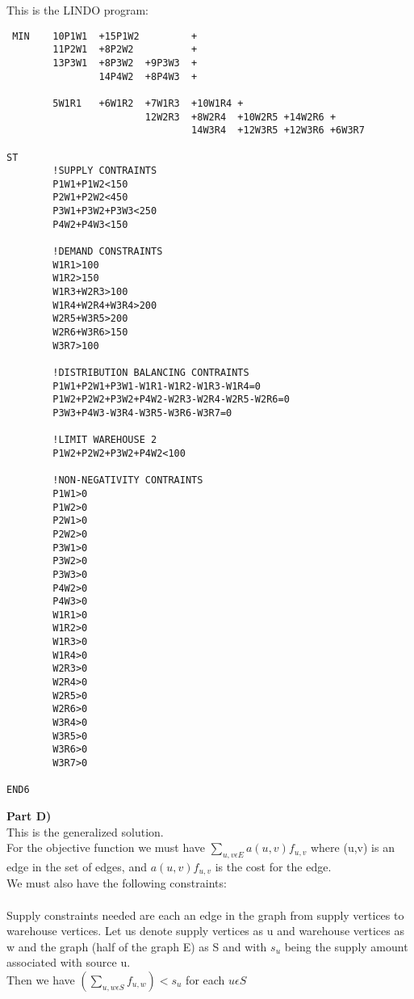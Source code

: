 This is the LINDO program:\\
\begin{verbatim}
 MIN    10P1W1  +15P1W2         +
        11P2W1  +8P2W2          +
        13P3W1  +8P3W2  +9P3W3  +
                14P4W2  +8P4W3  +
        
        5W1R1   +6W1R2  +7W1R3  +10W1R4 +
                        12W2R3  +8W2R4  +10W2R5 +14W2R6 +
                                14W3R4  +12W3R5 +12W3R6 +6W3R7

ST
        !SUPPLY CONTRAINTS
        P1W1+P1W2<150
        P2W1+P2W2<450
        P3W1+P3W2+P3W3<250
        P4W2+P4W3<150

        !DEMAND CONSTRAINTS
        W1R1>100
        W1R2>150
        W1R3+W2R3>100
        W1R4+W2R4+W3R4>200
        W2R5+W3R5>200
        W2R6+W3R6>150
        W3R7>100        

        !DISTRIBUTION BALANCING CONTRAINTS
        P1W1+P2W1+P3W1-W1R1-W1R2-W1R3-W1R4=0
        P1W2+P2W2+P3W2+P4W2-W2R3-W2R4-W2R5-W2R6=0
        P3W3+P4W3-W3R4-W3R5-W3R6-W3R7=0

        !LIMIT WAREHOUSE 2
        P1W2+P2W2+P3W2+P4W2<100

        !NON-NEGATIVITY CONTRAINTS
        P1W1>0
        P1W2>0
        P2W1>0
        P2W2>0
        P3W1>0
        P3W2>0
        P3W3>0
        P4W2>0
        P4W3>0
        W1R1>0
        W1R2>0
        W1R3>0
        W1R4>0
        W2R3>0
        W2R4>0
        W2R5>0
        W2R6>0
        W3R4>0
        W3R5>0
        W3R6>0
        W3R7>0

END6
\end{verbatim}

\textbf{Part D)}\\
This is the generalized solution.\\
For the objective function we must have $\sum\limits_{u,v\epsilon E} a(u,v)f_{u,v}$ where (u,v) is an edge in the set
of edges, and $a(u,v)f_{u,v}$ is the cost for the edge.
\\
We must also have the following constraints:\\ 
\\
Supply constraints needed are each an edge in the graph from supply vertices to warehouse vertices.  Let us denote supply vertices as
u and warehouse vertices as w and the graph (half of the graph E) as S and with $s_u$ being the supply amount associated with source u.\\
Then we have $(\sum\limits_{u,w\epsilon S} f_{u,w})<s_u$ for each $u \epsilon S$

